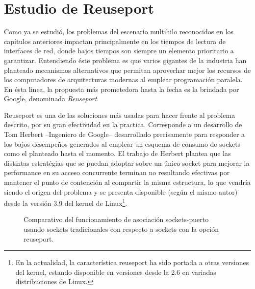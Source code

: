 \chapter{Estudio de Reuseport}

Como ya se estudió, los problemas del escenario multihilo reconocidos en los capítulos anteriores impactan principalmente en los tiempos de lectura de interfaces de red, donde bajos tiempos son siempre un elemento prioritario a garantizar. Entendiendo éste problema es que varios gigantes de la industria han planteado mecanismos alternativos que permitan aprovechar mejor los recursos de los computadores de arquitecturas modernas al emplear programación paralela. En ésta linea, la propuesta más prometedora hasta la fecha es la brindada por Google, denominada \emph{Reuseport}.

Reuseport \cite{slides:googleReuseport} es una de las soluciones más usadas para hacer frente al problema descrito, por su gran efectividad en la practica. Corresponde a un desarrollo de Tom Herbert --Ingeniero de Google-- desarrollado precisamente para responder a los bajos desempeños generados al emplear un esquema de consumo de sockets como el planteado hasta el momento. El trabajo de Herbert plantea que las distintas estratégias que se puedan adoptar sobre un único socket para mejorar la performance en su acceso concurrente terminan no resultando efectivas por mantener el punto de contención al compartir la misma estructura, lo que vendría siendo el origen del problema y se presenta disponible (según el mismo autor) desde la versión 3.9 del kernel de Linux\footnote{En la actualidad, la característica reuseport ha sido portada a otras versiones del kernel, estando disponible en versiones desde la 2.6 en variadas distribuciones de Linux.}.

\begin{figure}[h!]
	\centering
	\hspace*{\fill}
	\hfill
	\caption{Comparativo del funcionamiento de asociación sockets-puerto usando sockets tradicionales con respecto a sockets con la opción reuseport.}
	\label{fig:socketHandshake}
	\hspace*{\fill}
\end{figure}

